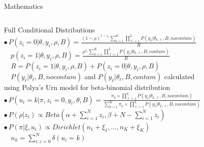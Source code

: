 \documentclass[letter,graphicx]{beamer}
\begin{document}
\begin{frame}{Mathematics}
\begin{tiny}
\begin{columns}[T]
Full Conditional Distributions \\ \vspace{1mm}
$\bullet \, P(z_i=0|\theta,y_i,\rho,B) = \frac{(1-\rho)^{1-z_i}\sum_{k=1}^{K} \prod_{\ell=1}^{L} P(y_{\ell}|\theta_{k,\ell},B,nocontam)}{R}$ \\ 
\vspace{1mm}
$\quad p(z_i=1|\theta,y_i,\rho,B) = \frac{\rho^{z_i}\sum_{k=1}^{K} \prod_{\ell=1}^{L} P(y_{\ell}|\theta_{k,\ell},B,contam)}{R}$ \\
 \vspace{1mm}
$\quad R = P(z_i=1|\theta,y_i,\rho,B) + P(z_i = 0|\theta,y_i,\rho,B)$ \\ 
\vspace{1mm}
$\quad P(y_{\ell} |\theta_{\ell},B,nocontam)$ and $P(y_{\ell} |\theta_{\ell},B,contam)$ calculated \\
\vspace{1mm}
\quad using Polya's Urn model for beta-binomial distribution \\
\vspace{1mm}
$\bullet \, P(u_i = k|\pi,z_i=0,y_i,\theta,B) = \frac{\pi_k \times \prod_{\ell=1}^{L} P(y_{\ell}|\theta_{k,\ell},B,nocontam)}{\sum_{k=1}^{K} \pi_k \times \prod_{\ell=1}^{L} P(y_{\ell}|\theta_{k,\ell},B,nocontam)}$ \\
\vspace{1mm}
$\bullet \, P(\rho|z_i) \propto Beta(\alpha + \sum_{i=1}^{N} z_i, \beta + N - \sum_{i=1}^{N} z_i)$ \\ \vspace{1mm}
$\bullet \, P(\pi|\xi,u_i) \propto Dirichlet(n_1 + \xi_1, \ldots, n_K + \xi_K)$ \\
\vspace{1mm}
$\quad n_k = \sum_{i:z=0}^{N} \delta(u_{i} = k)$
\end{columns}
\end{tiny}
\end{frame} 
\end{document}
